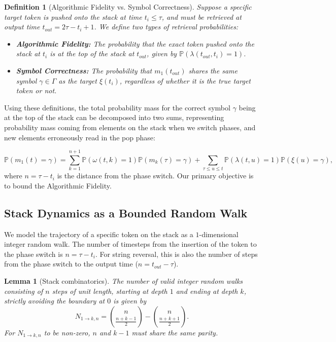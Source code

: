 \documentclass[10pt]{article} %
\newtheorem{definition}[theorem]{Definition}
\newtheorem{lemma}[theorem]{Lemma}
\begin{document}
\begin{definition}[Algorithmic Fidelity vs. Symbol Correctness]
    Suppose a specific target token is pushed onto the stack at time $t_i \leq \tau$, and must be retrieved at output time $t_{out} = 2\tau - t_i +1$. We define two types of retrieval probabilities:
    \begin{itemize}
        \item \textbf{Algorithmic Fidelity:} The probability that the exact token pushed onto the stack at $t_i$ is at the top of the stack at $t_{out}$, given by $\mathbb{P}(\lambda(t_{out}, t_i) = 1)$.
        \item \textbf{Symbol Correctness:} The probability that $m_1(t_{out})$ shares the same symbol $\gamma \in \Gamma$ as the target $\xi(t_i)$, regardless of whether it is the true target token or not.
    \end{itemize}
\end{definition}

Using these definitions, the total probability mass for the correct symbol $\gamma$ being at the top of the stack can be decomposed into two sums, representing probability mass coming from elements on the stack when we switch phases, and new elements erroneously read in the pop phase:

$$
\mathbb{P}(m_1(t) = \gamma) = \sum_{k=1}^{n+1}\mathbb{P}(\omega(t,k) = 1)\mathbb{P}(m_k(\tau)=\gamma) + \sum_{\tau \leq u \leq t}\mathbb{P}(\lambda(t,u) = 1)\mathbb{P}(\xi(u) = \gamma),
$$
where $n = \tau - t_i$ is the distance from the phase switch. Our primary objective is to bound the Algorithmic Fidelity.

\subsection{Stack Dynamics as a Bounded Random Walk}

We model the trajectory of a specific token on the stack as a $1$-dimensional integer random walk. The number of timesteps from the insertion of the token to the phase switch is $n = \tau - t_i$. For string reversal, this is also the number of steps from the phase switch to the output time ($n = t_{out} - \tau$).

\begin{lemma}[Stack combinatorics]
\label{lem:stack-paths}
The number of valid integer random walks consisting of $n$ steps of unit length, starting at depth $1$ and ending at depth $k$, strictly avoiding the boundary at $0$ is given by
$$
N_{1 \rightarrow k,n } = \binom{n}{\frac{n+k-1}{2}} - \binom{n}{\frac{n+k+1}{2}}.
$$
For $N_{1 \rightarrow k,n}$ to be non-zero, $n$ and $k-1$ must share the same parity.
\end{lemma}
\end{document}
